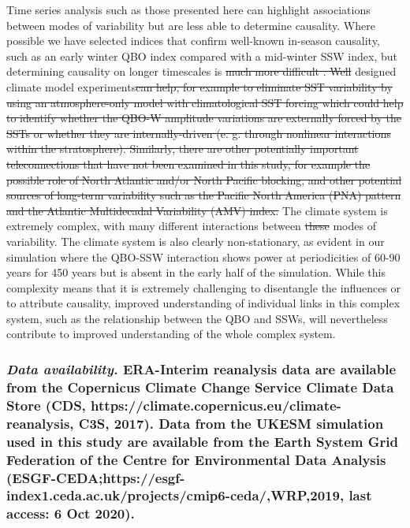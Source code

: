 \documentclass[wcd, manuscript]{copernicus}
\providecommand{\DIFadd}[1]{{\protect\color{blue}\uwave{#1}}} %
\providecommand{\DIFdel}[1]{{\protect\color{red}\sout{#1}}}                      %
\providecommand{\DIFaddbegin}{} %
\providecommand{\DIFaddend}{} %
\providecommand{\DIFdelbegin}{} %
\providecommand{\DIFdelend}{} %
\begin{document}
Time series analysis such as those presented here can highlight associations between modes of variability but are less able to determine causality. Where possible we have selected indices that confirm well-known in-season causality, such as an early winter QBO index compared with a mid-winter SSW index, but determining causality on longer timescales is  \DIFdelbegin \DIFdel{much more difficult . Well }\DIFdelend \DIFaddbegin \DIFadd{difficult and would require well }\DIFaddend designed climate model experiments\DIFdelbegin \DIFdel{can help, for example to eliminate SST variability by using an atmosphere-only model with climatological SST forcing which could help to identify whether the QBO-W amplitude variations are externally forced by the SSTs or whether they are internally-driven (e. g. through nonlinear interactions within the stratosphere).  Similarly, there are other potentially important teleconnections that have not been examined in this study, for example the possible role of North Atlantic and/or North Pacific blocking, and other potential sources of long-term variability such as the Pacific North America (PNA) pattern and the Atlantic Multidecadal Variability (AMV) index. }\DIFdelend \DIFaddbegin \DIFadd{. }\DIFaddend The climate system is extremely complex, with many different interactions between \DIFdelbegin \DIFdel{these }\DIFdelend modes of variability. The climate system is also clearly non-stationary, as evident in our simulation where the QBO-SSW interaction shows power at periodicities of 60-90 years for 450 years but is absent in the early half of the simulation. While this complexity means that it is extremely challenging to disentangle the influences or to attribute causality, improved understanding of individual links in this complex system, such as the relationship between the QBO and SSWs, will nevertheless contribute to improved understanding of the whole complex system.   


\subsubsection*{\normalsize\normalfont\textit{Data availability. }ERA-Interim reanalysis data are available from the Copernicus Climate Change Service Climate Data Store \newline(CDS, https://climate.copernicus.eu/climate-reanalysis,
C3S, 2017). Data from the UKESM simulation used in this study are available from the Earth System Grid Federation of the Centre for Environmental Data Analysis (ESGF-CEDA;https://esgf-index1.ceda.ac.uk/projects/cmip6-ceda/,WRP,2019, last access: 6 Oct 2020).}
\end{document}
